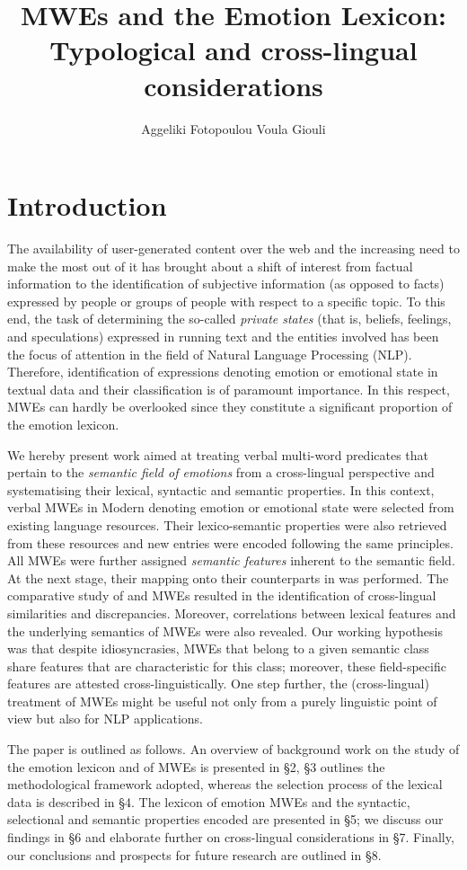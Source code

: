 \documentclass[output=paper]{langsci/langscibook}
\author{Aggeliki Fotopoulou\affiliation{Institute for Language and Speech Processing, Athena RIC, Greece}\lastand
Voula Giouli \affiliation{Institute for Language and Speech Processing, Athena RIC, Greece}}
\title{MWEs and the Emotion Lexicon: Typological and cross-lingual considerations}
\begin{document}
\section{Introduction}


The availability of user-generated content over the web and the
increasing need to make the most out of it has brought about a shift of
interest from factual information to the identification of subjective
information (as opposed to facts) expressed by people or groups of
people with respect to a specific topic. To this end, the task of
determining the so-called \textit{private states} (that is,
beliefs, feelings, and speculations) expressed in running text and the
entities involved has been the focus of attention in the field of 
Natural Language Processing (NLP). Therefore, identification of
expressions denoting emotion or emotional state in textual data and
their classification is of paramount importance. In this respect, MWEs
can hardly be overlooked since they constitute a significant proportion
of the emotion lexicon.

We hereby present work aimed at treating  verbal multi-word predicates
that pertain to the \textit{semantic field of emotions} from a
cross-lingual perspective and systematising their lexical, syntactic
and semantic properties. In this context, verbal MWEs in Modern  denoting emotion or emotional state were selected from existing
language resources. Their lexico-semantic properties were also
retrieved from these resources and new entries were encoded following the
same principles. All MWEs were further assigned \textit{semantic
features }inherent to the semantic field. At the next stage, their
mapping onto their counterparts in  was performed. The
comparative study of  and  MWEs resulted in the identification of
cross-lingual similarities and discrepancies. Moreover, correlations
between lexical features and the underlying semantics of MWEs were also
revealed. Our working hypothesis was that despite idiosyncrasies, MWEs
that belong to a given semantic class share features that are
characteristic for this class; moreover, these field-specific features
are attested cross-linguistically. One step further, the
(cross-lingual) treatment of MWEs might be useful not only from a
purely linguistic point of view but also for NLP applications.


The paper is outlined as follows. An overview of background work on the
study of the emotion lexicon and of MWEs is presented in §2,
 §3 outlines the methodological framework adopted,
whereas the selection process of the lexical data is described in
§4. The lexicon of emotion MWEs and the syntactic, selectional
and semantic properties encoded are presented in §5; we discuss
our findings in §6 and elaborate further on cross-lingual
considerations in §7. Finally, our conclusions and prospects for
future research are outlined in §8.
\end{document}
